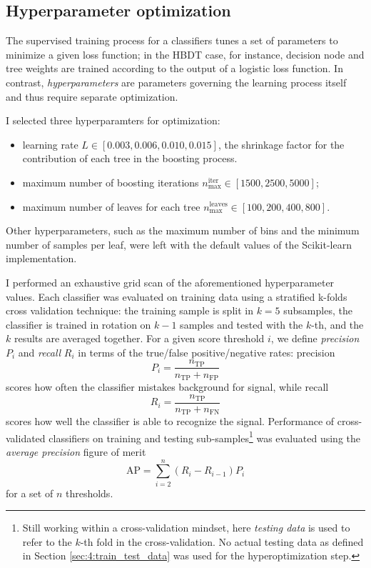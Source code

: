 \subsection{Hyperparameter optimization}
\label{sec:4:hyperoptimization}

The supervised training process for a classifiers tunes a set of parameters to minimize a given loss function; in the HBDT case, for instance, decision node and tree weights are trained according to the output of a logistic loss function.
In contrast, \textit{hyperparameters} are parameters governing the learning process itself and thus require separate optimization.

I selected three hyperparamters for optimization:
\begin{itemize}
	\item learning rate $L \in [0.003, 0.006, 0.010, 0.015]$, the shrinkage factor for the contribution of each tree in the boosting process.
	\item maximum number of boosting iterations $n_\text{max}^\text{iter} \in [1500, 2500, 5000]$;
	\item maximum number of leaves for each tree $n_\text{max}^\text{leaves} \in [100, 200, 400, 800]$.
\end{itemize}
Other hyperparameters, such as the maximum number of bins and the minimum number of samples per leaf, were left with the default values of the Scikit-learn implementation.

I performed an exhaustive grid scan of the aforementioned hyperparameter values.
Each classifier was evaluated on training data using a stratified k-folds cross validation technique: the training sample is split in $k=5$ subsamples, the classifier is trained in rotation on $k-1$ samples and tested with the $k$-th, and the $k$ results are averaged together.
For a given score threshold $i$, we define \textit{precision} $P_i$ and \textit{recall} $R_i$ in terms of the true/false positive/negative rates: precision 
\begin{equation}
	P_i = \frac{n_\text{TP}}{n_\text{TP} + n_\text{FP}}
	\label{eq:4:precision}
\end{equation}
scores how often the classifier mistakes background for signal, while recall
\begin{equation}
	R_i = \frac{n_\text{TP}}{n_\text{TP} + n_\text{FN}}
	\label{eq:4:recall}
\end{equation}
scores how well the classifier is able to recognize the signal.
Performance of cross-validated classifiers on training and testing sub-samples\footnote{Still working within a cross-validation mindset, here \textit{testing data} is used to refer to the $k$-th fold in the cross-validation. No actual testing data as defined in Section \ref{sec:4:train_test_data} was used for the hyperoptimization step.} was evaluated using the \textit{average precision} figure of merit
\begin{equation}
	\text{AP} = \sum_{i=2}^{n} (R_i - R_{i-1})P_i
	\label{eq:4:average_prec}
\end{equation}
for a set of $n$ thresholds.

